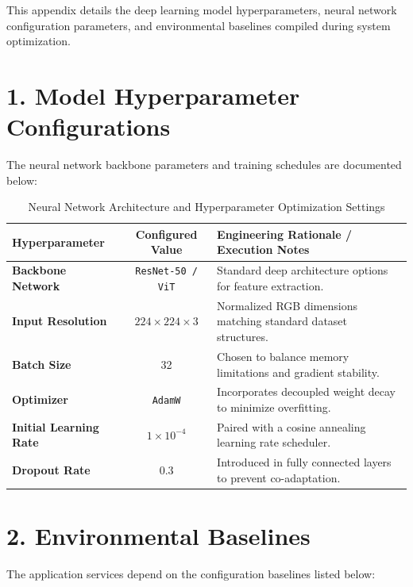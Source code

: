 This appendix details the deep learning model hyperparameters, neural network configuration parameters, and environmental baselines compiled during system optimization.

\section*{1. Model Hyperparameter Configurations}
The neural network backbone parameters and training schedules are documented below:

\begin{table}[htbp]
  \centering
  \caption{Neural Network Architecture and Hyperparameter Optimization Settings}
  \label{tab:app-modelconfig}
  \small
  \renewcommand{\arraystretch}{1.1}
  \begin{tabularx}{\textwidth}{|l|c|X|}
    \hline
    \textbf{Hyperparameter} & \textbf{Configured Value} & \textbf{Engineering Rationale / Execution Notes} \\
    \hline
    \textbf{Backbone Network} & \texttt{ResNet-50 / ViT} & Standard deep architecture options for feature extraction. \\
    \textbf{Input Resolution} & $224 \times 224 \times 3$ & Normalized RGB dimensions matching standard dataset structures. \\
    \textbf{Batch Size} & 32 & Chosen to balance memory limitations and gradient stability. \\
    \textbf{Optimizer} & \texttt{AdamW} & Incorporates decoupled weight decay to minimize overfitting. \\
    \textbf{Initial Learning Rate} & $1 \times 10^{-4}$ & Paired with a cosine annealing learning rate scheduler. \\
    \textbf{Dropout Rate} & 0.3 & Introduced in fully connected layers to prevent co-adaptation. \\
    \hline
  \end{tabularx}
\end{table}

\section*{2. Environmental Baselines}
The application services depend on the configuration baselines listed below:

